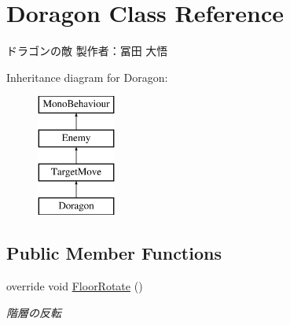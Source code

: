 \hypertarget{class_doragon}{}\section{Doragon Class Reference}
\label{class_doragon}


ドラゴンの敵 製作者：冨田 大悟  


Inheritance diagram for Doragon\+:\begin{figure}[H]
\begin{center}
\leavevmode
\includegraphics[height=4.000000cm]{class_doragon}
\end{center}
\end{figure}
\subsection*{Public Member Functions}
\begin{DoxyCompactItemize}
\item 
override void \hyperlink{class_doragon_ad83502ad8778d1e9fa0f6d2d72526d85}{Floor\+Rotate} ()
\begin{DoxyCompactList}\small\item\em 階層の反転 \end{DoxyCompactList}\end{DoxyCompactItemize}
